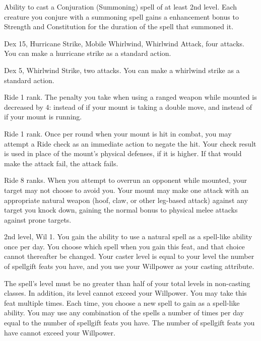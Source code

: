 \featpre Ability to cast a Conjuration (Summoning) spell of at least 2nd level.
\featben Each creature you conjure with a summoning spell gains a  enhancement bonus to Strength and Constitution for the duration of the spell that summoned it.

\featpres Dex 15, Hurricane Strike, Mobile Whirlwind, Whirlwind Attack, four attacks.
\featben You can make a hurricane strike as a standard action.

\featpres Dex 5, Whirlwind Strike, two attacks.
\featben You can make a whirlwind strike as a standard action.

\featpre Ride 1 rank.
\featben The penalty you take when using a ranged weapon while mounted is decreased by 4:  instead of  if your mount is taking a double move, and  instead of  if your mount is running.

\featpre Ride 1 rank.
\featben Once per round when your mount is hit in combat, you may attempt a Ride check as an immediate action to negate the hit.
Your check result is used in place of the mount's physical defenses, if it is higher.
If that would make the attack fail, the attack fails.

\featpres
Ride 8 ranks.
\featben When you attempt to overrun an opponent while mounted, your target may not choose to avoid you.
Your mount may make one attack with an appropriate natural weapon (hoof, claw, or other leg-based attack) against any target you knock down, gaining the normal  bonus to physical melee attacks against prone targets.

\featpres 2nd level, Wil 1.
\featben You gain the ability to use a natural spell as a spell-like ability once per day.
You choose which spell when you gain this feat, and that choice cannot thereafter be changed.
Your caster level is equal to your level \add the number of spellgift feats you have, and you use your Willpower as your casting attribute.

The spell's level must be no greater than half of your total levels in non-casting classes.
In addition, its level cannot exceed your Willpower.
You may take this feat multiple times.
Each time, you choose a new spell to gain as a spell-like ability.
You may use any combination of the spells a number of times per day equal to the number of spellgift feats you have.
The number of spellgift feats you have cannot exceed your Willpower.


